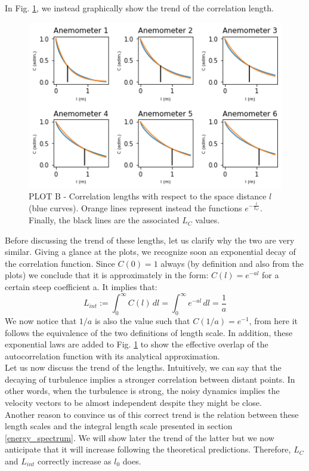 \documentclass[11pt,titlepage]{article}
\begin{document}
In Fig. \ref{fig2}, we instead graphically show the trend of the correlation length.
	\begin{center} 
	\begin{figure} [h]
		\centering
		\includegraphics[width = 4.5in]{./figures/ex1_2.png}
		\caption{PLOT B - Correlation lengths with respect to the space distance $l$ (blue curves). Orange lines represent instead the functions $e^{-\frac{l}{L_C}}$. Finally, the black lines are the associated $L_C$ values.}
		\label{fig2}
	\end{figure}
\end{center}

Before discussing the trend of these lengths, let us clarify why the two are very similar. Giving a glance at the plots, we recognize soon an exponential decay of the correlation function. Since $C(0)=1$ always (by definition and also from the plots) we conclude that it is approximately in the form: $C(l) = e^{-al}$ for a certain steep coefficient a. It implies that:
\begin{equation*}
	L_{int} := \int_0^{\infty} C(l)\, dl =  \int_0^{\infty} e^{-al}\, dl = \frac{1}{a}
\end{equation*}
We now notice that $1/a$ is also the value such that $C(1/a) = e^{-1}$, from here it follows the equivalence of the two definitions of length scale. In addition, these exponential laws are added to Fig. \ref{fig2} to show the effective overlap of the autocorrelation function with its analytical approximation.\\

Let us now discuss the trend of the lengths. Intuitively, we can say that the decaying of turbulence implies a stronger correlation between distant points. In other words, when the turbulence is strong, the noisy dynamics implies the velocity vectors to be almost independent despite they might be close. \\ 
Another reason to convince us of this correct trend is the relation between these length scales and the integral length scale presented in section \ref{energy_spectrum}. We will show later the trend of the latter but we now anticipate that it will increase following the theoretical predictions. Therefore, $L_C$ and $L_{int}$ correctly increase as $l_0$ does.
\end{document}
